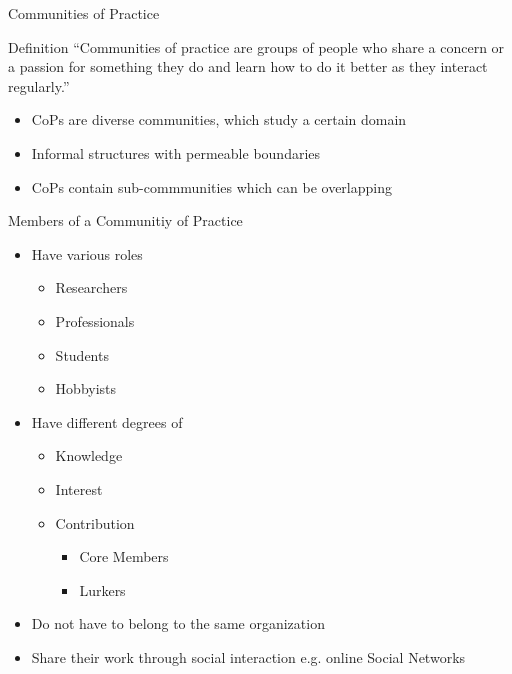 \begin{frame}{Communities of Practice}
  \begin{block}{Definition}
    ``Communities of practice are groups of people who share a concern or a
    passion for something they do and learn how to do it better as they interact regularly.'' \cite{Weng98}
  \end{block}
  \begin{itemize}
    \item CoPs are diverse communities, which study a certain domain
    \item Informal structures with permeable boundaries \cite{RKJa15}
    \item CoPs contain sub-commmunities which can be overlapping
  \end{itemize}
\end{frame}


\begin{frame}{Members of a Communitiy of Practice}
  \begin{itemize}
    \item Have various roles
          \begin{itemize}
            \item Researchers
            \item Professionals
            \item Students
            \item Hobbyists
          \end{itemize} %
    \item Have different degrees of
          \begin{itemize}
            \item Knowledge %
            \item Interest %
            \item Contribution
                  \begin{itemize}
                    \item Core Members %
                    \item Lurkers %
                  \end{itemize}
          \end{itemize}
    \item Do not have to belong to the same organization
    \item Share their work through social interaction e.g. online Social Networks %
  \end{itemize}
\end{frame}


